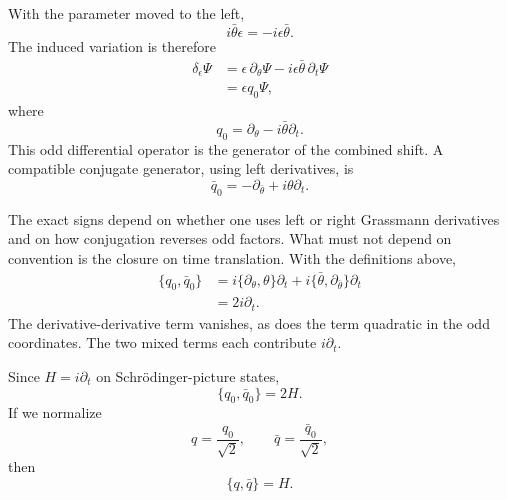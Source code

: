 With the parameter moved to the left,
\begin{equation}
i\bar\theta\epsilon=-i\epsilon\bar\theta.
\end{equation}
The induced variation is therefore
\begin{align}
\delta_\epsilon\Psi
&=\epsilon\,\partial_\theta\Psi
-i\epsilon\bar\theta\,\partial_t\Psi\\
&=\epsilon q_0\Psi,
\end{align}
where
\begin{equation}
q_0=\partial_\theta-i\bar\theta\partial_t.
\end{equation}
This odd differential operator is the generator of the combined shift. A compatible conjugate generator, using left derivatives, is
\begin{equation}
\bar q_0=-\partial_{\bar\theta}
+i\theta\partial_t.
\end{equation}

The exact signs depend on whether one uses left or right Grassmann derivatives and on how conjugation reverses odd factors. What must not depend on convention is the closure on time translation. With the definitions above,
\begin{align}
\{q_0,\bar q_0\}
&=i\{\partial_\theta,\theta\}\partial_t
+i\{\bar\theta,\partial_{\bar\theta}\}\partial_t\\
&=2i\partial_t.
\end{align}
The derivative-derivative term vanishes, as does the term quadratic in the odd coordinates. The two mixed terms each contribute \(i\partial_t\).

Since \(H=i\partial_t\) on Schrödinger-picture states,
\begin{equation}
\{q_0,\bar q_0\}=2H.
\end{equation}
If we normalize
\begin{equation}
q=\frac{q_0}{\sqrt2},
\qquad
\bar q=\frac{\bar q_0}{\sqrt2},
\end{equation}
then
\begin{equation}
\boxed{\{q,\bar q\}=H.}
\end{equation}

\begin{classroomqa}
\end{classroomqa}

